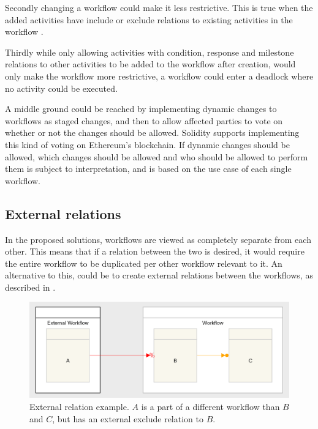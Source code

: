 \documentclass{article}
\begin{document}
			Secondly changing a workflow could make it less restrictive. 
			This is true when the added activities have include or exclude relations to existing activities in the workflow \cite{dynamic-workflows}.

			Thirdly while only allowing activities with condition, response and milestone relations to other activities to be added to the workflow after creation, would only make the workflow more restrictive, a workflow could enter a deadlock where no activity could be executed.

			A middle ground could be reached by implementing dynamic changes to workflows as staged changes, and then to allow affected parties to vote on whether or not the changes should be allowed.
			Solidity supports implementing this kind of voting on Ethereum's blockchain.\cite{voting} 
			If dynamic changes should be allowed, which changes should be allowed and who should be allowed to perform them is subject to interpretation, and is based on the use case of each single workflow.

		\subsection{External relations}
		\label{sec:external-relations}
		In the proposed solutions, workflows are viewed as completely separate from each other. 
		This means that if a relation between the two is desired, it would require the entire workflow to be duplicated per other workflow relevant to it.
		An alternative to this, could be to create external relations between the workflows, as described in \cite{distributed-workflows}.

		\begin{figure}[!ht]
			\centering
			\includegraphics[scale=0.3]{figures/external-relations-example.png}
		 	\caption[External relation example]
		 	{External relation example. $A$ is a part of a different workflow than $B$ and $C$, but has an external exclude relation to $B$.}
		 	\label{fig:external-relations-example}
		\end{figure}
\end{document}
